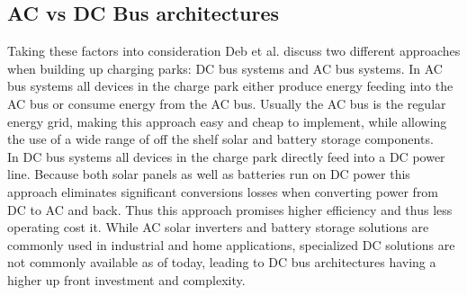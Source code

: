 \documentclass[conference,flushend]{iaria} %
\begin{document}
\subsection{AC vs DC Bus architectures}
Taking these factors into consideration Deb et al. \cite{deb_review_2021} discuss two different approaches when building up charging parks: DC bus systems and AC bus systems.
In AC bus systems all devices in the charge park either produce energy feeding into the AC bus or consume energy from the AC bus.
Usually the AC bus is the regular energy grid, making this approach easy and cheap to implement, while allowing the use of a wide range of off the shelf solar and battery storage components. \\
In DC bus systems all devices in the charge park directly feed into a DC power line. Because both solar panels as well as batteries run on DC power this approach eliminates significant conversions losses when converting power from DC to AC and back.
Thus this approach promises higher efficiency and thus less operating cost it.
While AC solar inverters and battery storage solutions are commonly used in industrial and home applications, specialized DC solutions are not commonly available as of today, leading to DC bus architectures having a higher up front investment and complexity.
\end{document}
